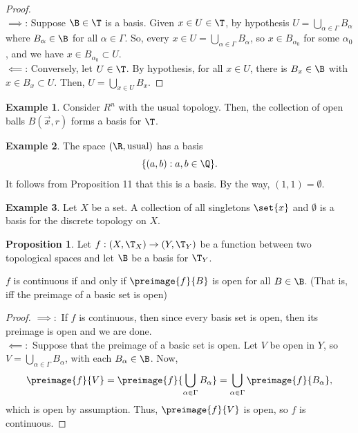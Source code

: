 \documentclass[a5paper]{article}
\theoremstyle{definition}%
\newtheorem{proposition}[theorem]{Proposition}
\newtheorem*{example*}{Example}
\numberwithin{exercise}{section}
\theoremstyle{remark}%
\begin{document}
\begin{proof}\mbox{}\\
$\implies$: Suppose $\B\in \T$ is a basis. Given $x\in U\in\T$, by hypothesis $U=\bigcup_{\alpha\in\Gamma}B_\alpha$ where $B_\alpha\in\B$ for all $\alpha\in\Gamma$. So, every $x\in U=\bigcup_{\alpha\in\Gamma}B_\alpha$, so $x\in B_{\alpha_0}$ for some $\alpha_0$, and we have $x \in B_{\alpha_0}\subset U$. 
\\
$\impliedby$: Conversely, let $U\in\T$. By hypothesis, for all $x\in U$, there is $B_x\in \B$ with $x\in B_x \subset U$. Then, $U=\bigcup_{x\in U}B_x$. 
\end{proof}

\begin{example*}
Consider $R^n$ with the usual topology. Then, the collection of open balls $B(\vec{x},r)$ forms a basis for $\T$. 
\end{example*}

\begin{example*}
The space $(\R, \text{usual})$ has a basis 
$$\{(a,b):a,b\in\Q\}.$$
It follows from Proposition 11 that this is a basis. By the way, $(1,1)=\emptyset$.
\end{example*}

\begin{example*}
Let $X$ be a set. A collection of all singletons $\set{x}$ and $\emptyset$ is a basis for the discrete topology on $X$. 
\end{example*}


\begin{highlight}
\begin{proposition} Let $f:(X,\T_X)\to(Y,\T_Y)$ be a function between two topological spaces and let $\B$ be a basis for $\T_Y$.

$f$ is continuous if and only if $\preimage{f}{B}$ is open for all $B\in\B$. (That is, iff the preimage of a basic set is open)
\end{proposition}
\end{highlight}
\begin{proof}
$\implies:$ If $f$ is continuous, then since every basis set is open, then its preimage is open and we are done. \\
$\impliedby:$ Suppose that the preimage of a basic set is open. Let $V$ be open in $Y$, so $V=\bigcup\limits_{\alpha\in\Gamma}B_\alpha$, with each $B_\alpha\in\B$. Now, $$\preimage{f}{V}=\preimage{f}{\bigcup\limits_{\alpha\in\Gamma}B_\alpha}=\bigcup\limits_{\alpha\in\Gamma}\preimage{f}{B_\alpha},$$
which is open by assumption. Thus, $\preimage{f}{V}$ is open, so $f$ is continuous. 
\end{proof}
\end{document}
